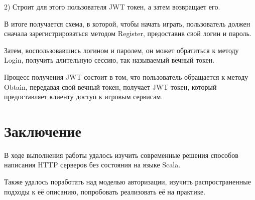 \documentclass[14pt]{extarticle}
\begin{document}
    2) Строит для этого пользователя JWT токен, а затем возвращает его.

    В итоге получается схема, в которой, чтобы начать играть, пользователь должен сначала
    зарегистрироваться методом Register, предоставив свой логин и пароль.

    Затем, воспользовавшись логином и паролем, он может обратиться к методу Login, получить длительную сессию, так
    называемый вечный токен.

    Процесс получения JWT состоит в том, что пользователь обращается к методу Obtain, передавая свой вечный токен,
    получает JWT токен, который предоставляет клиенту доступ к игровым сервисам.

    \section{Заключение}

    В ходе выполнения работы удалось изучить современные решения способов написания HTTP серверов без состояния на
    языке Scala.

    Также удалось поработать над моделью авторизации, изучить распространенные подходы к её описанию, попробовать
    реализовать её на практике.
\end{document}
